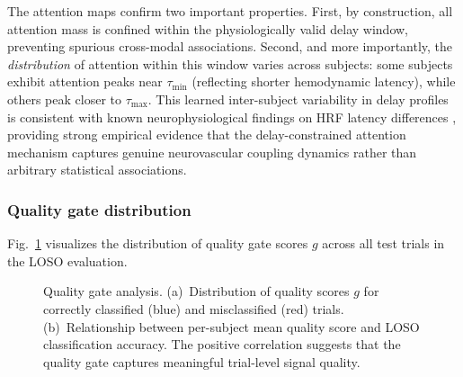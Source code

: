 \documentclass[preprint,12pt,authoryear]{elsarticle}
\begin{document}

The attention maps confirm two important properties. First, by construction, all attention mass is confined within the physiologically valid delay window, preventing spurious cross-modal associations. Second, and more importantly, the \textit{distribution} of attention within this window varies across subjects: some subjects exhibit attention peaks near $\tau_{\min}$ (reflecting shorter hemodynamic latency), while others peak closer to $\tau_{\max}$. This learned inter-subject variability in delay profiles is consistent with known neurophysiological findings on HRF latency differences \citep{lindquist2009modeling}, providing strong empirical evidence that the delay-constrained attention mechanism captures genuine neurovascular coupling dynamics rather than arbitrary statistical associations.


\subsubsection{Quality gate distribution}
\label{sec:vis_quality}

Fig.~\ref{fig:quality_dist} visualizes the distribution of quality gate scores $g$ across all test trials in the LOSO evaluation.

\begin{figure}[t]
\centering
\caption{Quality gate analysis. (a)~Distribution of quality scores $g$ for correctly classified (blue) and misclassified (red) trials. (b)~Relationship between per-subject mean quality score and LOSO classification accuracy. The positive correlation suggests that the quality gate captures meaningful trial-level signal quality.}
\label{fig:quality_dist}
\end{figure}
\end{document}
